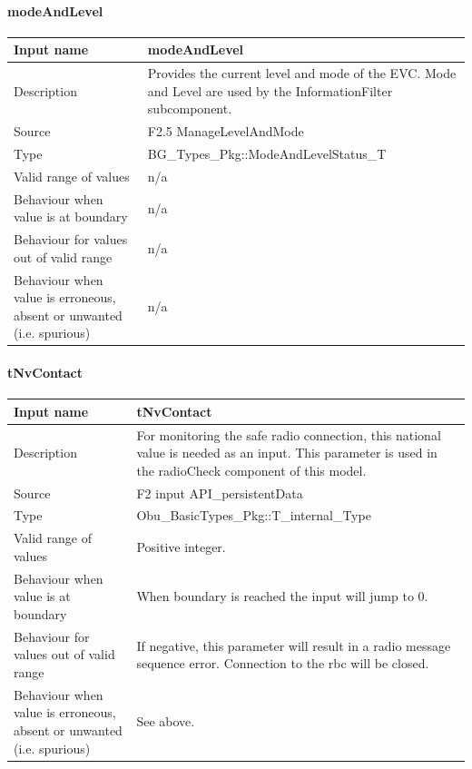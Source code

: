 \paragraph{modeAndLevel}

\begin{longtable}{p{}p{}}
\toprule
Input name				& modeAndLevel \\
\midrule
Description				& Provides the current level and mode of the EVC. Mode and Level are used by the InformationFilter subcomponent.\\
\midrule
Source					& F2.5 ManageLevelAndMode \\ 
\midrule
Type					& BG\_Types\_Pkg::ModeAndLevelStatus\_T \\
\midrule
Valid range of values	& n/a\\
\midrule
Behaviour when value is at boundary	& n/a\\
\midrule
Behaviour for values out of valid range	& n/a\\
\midrule
Behaviour when value is erroneous, absent or unwanted (i.e. spurious) & n/a\\
\bottomrule
\end{longtable}


\paragraph{tNvContact}

\begin{longtable}{p{}p{}}
\toprule
Input name				& tNvContact \\
\midrule
Description				& For monitoring the safe radio connection, this national value is needed as an input. This parameter is used in the radioCheck component of this model. \\
\midrule
Source					& F2 input API\_persistentData\\ 
\midrule
Type					& Obu\_BasicTypes\_Pkg::T\_internal\_Type \\
\midrule
Valid range of values	& Positive integer. \\
\midrule
Behaviour when value is at boundary	& When boundary is reached the input will jump to 0.\\
\midrule
Behaviour for values out of valid range	& If negative, this parameter will result in a radio message sequence error. Connection to the rbc will be closed.\\
\midrule
Behaviour when value is erroneous, absent or unwanted (i.e. spurious) & See above.\\
\bottomrule
\end{longtable}

